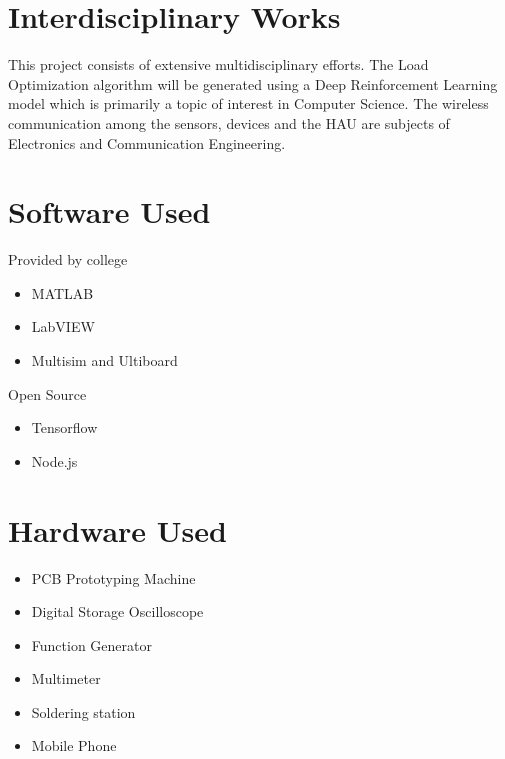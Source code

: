\documentclass[12pt,a4paper,titlepage,twoside]{article}
\begin{document}
        \section{Interdisciplinary Works}
        This project consists of extensive multidisciplinary efforts.
        The Load Optimization algorithm will be generated using a Deep Reinforcement Learning model which is primarily a topic of interest in Computer Science.
        The wireless communication among the sensors, devices and the HAU are subjects of Electronics and Communication Engineering.\\
        
        \section{Software Used}	
            Provided by college
            \begin{itemize}
                \item MATLAB
                \item LabVIEW
                \item Multisim and Ultiboard
            \end{itemize}
            Open Source
            \begin{itemize}
                \item Tensorflow
                \item Node.js
            \end{itemize}
        \section{Hardware Used}
            \begin{itemize}
                \item PCB Prototyping Machine
                \item Digital Storage Oscilloscope
                \item Function Generator
                \item Multimeter
                \item Soldering station
                \item Mobile Phone
            \end{itemize}
        
\end{document}

